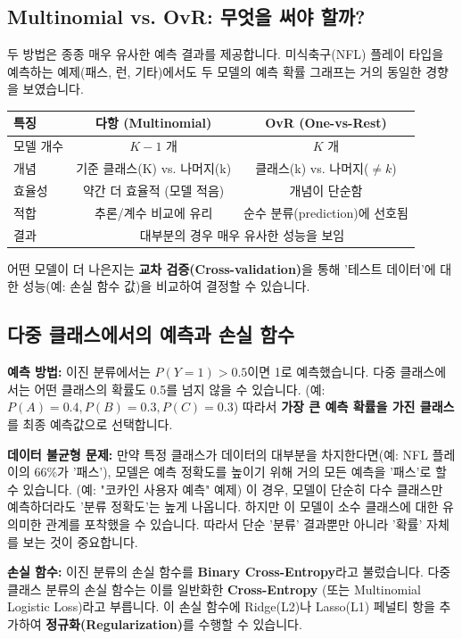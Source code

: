 \documentclass[11pt,a4paper]{book}
\theoremstyle{definition}
\begin{document}
\subsection{Multinomial vs. OvR: 무엇을 써야 할까?}

두 방법은 종종 매우 유사한 예측 결과를 제공합니다. 미식축구(NFL) 플레이 타입을 예측하는 예제(패스, 런, 기타)에서도 두 모델의 예측 확률 그래프는 거의 동일한 경향을 보였습니다.

\begin{center}
\begin{tabular}{l c c}
\toprule
\textbf{특징} & \textbf{다항 (Multinomial)} & \textbf{OvR (One-vs-Rest)} \\
\midrule
모델 개수 & $K-1$ 개 & $K$ 개 \\
개념 & 기준 클래스(K) vs. 나머지(k) & 클래스(k) vs. 나머지($\neq k$) \\
효율성 & 약간 더 효율적 (모델 적음) & 개념이 단순함 \\
적합 & 추론/계수 비교에 유리 & 순수 분류(prediction)에 선호됨 \\
결과 & \multicolumn{2}{c}{대부분의 경우 매우 유사한 성능을 보임} \\
\bottomrule
\end{tabular}
\end{center}

어떤 모델이 더 나은지는 \textbf{교차 검증(Cross-validation)}을 통해 '테스트 데이터'에 대한 성능(예: 손실 함수 값)을 비교하여 결정할 수 있습니다.

\subsection{다중 클래스에서의 예측과 손실 함수}

\textbf{예측 방법:}
이진 분류에서는 $P(Y=1) > 0.5$이면 1로 예측했습니다.
다중 클래스에서는 어떤 클래스의 확률도 0.5를 넘지 않을 수 있습니다. (예: $P(A)=0.4, P(B)=0.3, P(C)=0.3$)
따라서 \textbf{가장 큰 예측 확률을 가진 클래스}를 최종 예측값으로 선택합니다.

\textbf{데이터 불균형 문제:}
만약 특정 클래스가 데이터의 대부분을 차지한다면(예: NFL 플레이의 66\%가 '패스'), 모델은 예측 정확도를 높이기 위해 거의 모든 예측을 '패스'로 할 수 있습니다. (예: "코카인 사용자 예측" 예제)
이 경우, 모델이 단순히 다수 클래스만 예측하더라도 '분류 정확도'는 높게 나옵니다. 하지만 이 모델이 소수 클래스에 대한 유의미한 관계를 포착했을 수 있습니다. 따라서 단순 '분류' 결과뿐만 아니라 '확률' 자체를 보는 것이 중요합니다.

\textbf{손실 함수:}
이진 분류의 손실 함수를 \textbf{Binary Cross-Entropy}라고 불렀습니다.
다중 클래스 분류의 손실 함수는 이를 일반화한 \textbf{Cross-Entropy} (또는 Multinomial Logistic Loss)라고 부릅니다. 이 손실 함수에 Ridge(L2)나 Lasso(L1) 페널티 항을 추가하여 \textbf{정규화(Regularization)}를 수행할 수 있습니다.
\end{document}
